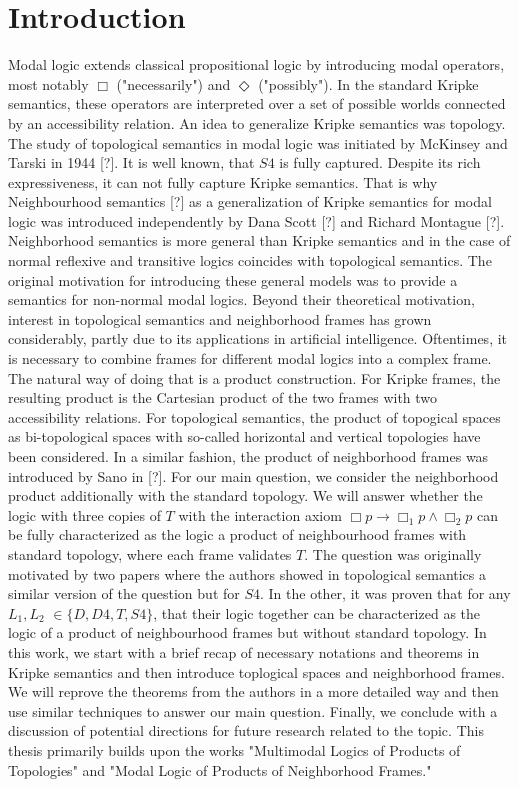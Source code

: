 \documentclass[12pt, a4paper]{scrartcl}
\begin{document}
\section{Introduction}
Modal logic extends classical propositional logic by introducing modal operators, most notably $\Box$ ("necessarily") and $\Diamond$ ("possibly"). In the standard Kripke semantics, 
these operators are interpreted over a set of possible worlds connected by an accessibility relation. An idea to generalize Kripke semantics was topology.
The study of topological semantics in modal logic was initiated by McKinsey and Tarski in 1944 [?]. It is well known, that $S4$ is fully captured. Despite its rich expressiveness,
it can not fully capture Kripke semantics. That is why Neighbourhood semantics [?] as a generalization of Kripke semantics for modal logic was introduced independently by Dana Scott [?] and Richard Montague [?].
Neighborhood semantics is more general than Kripke semantics and in the case of normal reflexive and transitive logics coincides with topological semantics.
The original motivation for introducing these general models was to provide a semantics for non-normal modal logics. 
Beyond their theoretical motivation, interest in topological semantics and neighborhood frames has grown considerably, partly due to its applications in artificial intelligence. \newline
Oftentimes, it is necessary to combine frames for different modal logics into a complex
frame. The natural way of doing that is a product construction. For Kripke frames,
the resulting product is the Cartesian product of the two frames with two accessibility
relations. For topological semantics, the product of topogical spaces as bi-topological
spaces with so-called horizontal and vertical topologies have been considered. In a similar
fashion, the product of neighborhood frames was introduced by Sano in [?]. \newline
For our main question, we consider the neighborhood product additionally with the standard topology. We will answer whether 
the logic with three copies of $T$ with the interaction axiom $\Box p \rightarrow \Box_1 p \land \Box_2 p$ can be fully characterized as the logic a product of neighbourhood frames with standard topology, where each frame validates $T$.
The question was originally motivated by two papers where the authors showed in topological semantics a similar version of the question but for $S4$. In the other, it was proven that for any $L_1, L_2$ $\in \{D,D4,T,S4\}$, that their logic together 
can be characterized as the logic of a product of neighbourhood frames but without standard topology. In this work, we start with a brief recap of necessary notations and theorems in Kripke semantics and then introduce toplogical spaces and neighborhood frames. 
We will reprove the theorems from the authors in a more detailed way and then use similar techniques to answer our main question.
Finally, we conclude with a discussion of potential directions for future research related to the topic. 
This thesis primarily builds upon the works "Multimodal Logics of Products of Topologies" and "Modal Logic of Products of Neighborhood Frames."
\end{document}
